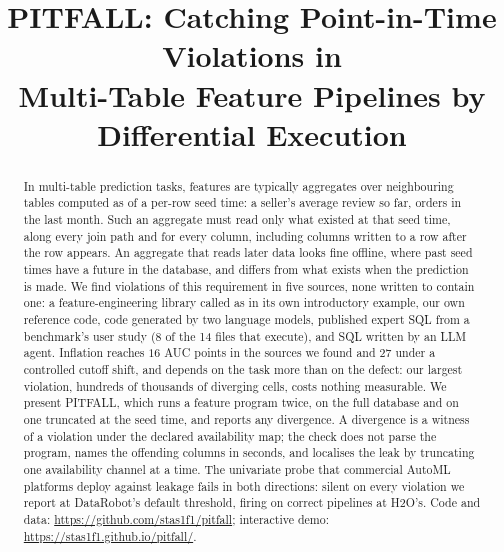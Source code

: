 \documentclass[conference]{IEEEtran}
\begin{document}
\title{PITFALL: Catching Point-in-Time Violations in\\Multi-Table Feature Pipelines by Differential Execution}

\author{
}

\maketitle
{}

\begin{abstract}
In multi-table prediction tasks, features are typically aggregates over neighbouring
tables computed as of a per-row seed time: a seller's average review so far, orders in
the last month. Such an aggregate must read only what existed at that seed time, along
every join path and for every column, including columns written to a row after the row
appears. An aggregate that reads later data looks fine offline, where past seed times
have a future in the database, and differs from what exists when the prediction is made.
We find violations of this requirement in five sources, none written to contain one:
a feature-engineering library called as in its own introductory example, our own
reference code, code generated by two language models, published expert SQL from a
benchmark's user study (8 of the 14 files that execute), and SQL written by an LLM agent.
Inflation reaches $16$ AUC points in the sources we found and $27$ under a controlled
cutoff shift, and depends on the task more than on the defect: our largest violation,
hundreds of thousands of diverging cells, costs nothing measurable.
We present PITFALL, which runs a feature
program twice, on the full database and on one truncated at the seed time, and reports
any divergence. A divergence is a witness of a violation under the declared availability
map; the check does not parse the program, names the offending columns in seconds,
and localises the leak by truncating one availability channel at a time. The univariate probe that commercial AutoML platforms deploy against leakage fails in
both directions: silent on every violation we report at DataRobot's default threshold,
firing on correct pipelines at H2O's. Code and data: \url{https://github.com/stas1f1/pitfall};
interactive demo: \url{https://stas1f1.github.io/pitfall/}.
\end{abstract}
\end{document}
